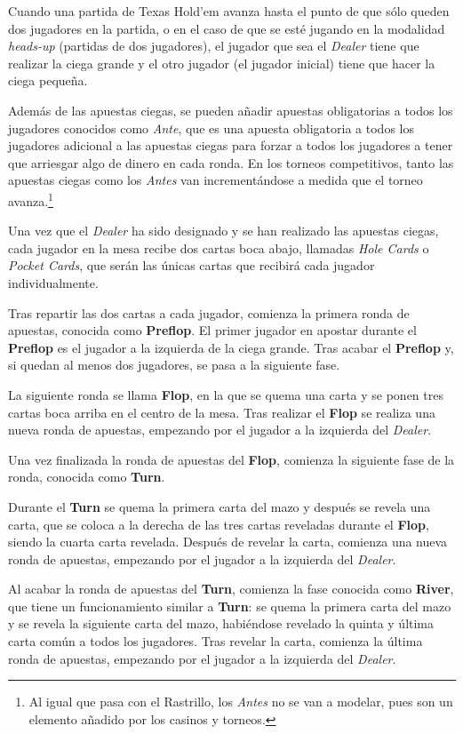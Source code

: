 Cuando una partida de Texas Hold'em avanza hasta el punto de que sólo queden dos jugadores en la partida, o en el caso de que se esté jugando en la modalidad \textit{heads-up} (partidas de dos jugadores), el jugador que sea el \textit{Dealer} tiene que realizar la ciega grande y el otro jugador (el jugador inicial) tiene que hacer la ciega pequeña.

Además de las apuestas ciegas, se pueden añadir apuestas obligatorias a todos los jugadores conocidos como \textit{Ante}, que es una apuesta obligatoria a todos los jugadores adicional a las apuestas ciegas para forzar a todos los jugadores a tener que arriesgar algo de dinero en cada ronda. En los torneos competitivos, tanto las apuestas ciegas como los \textit{Antes} van incrementándose a medida que el torneo avanza.\footnote{Al igual que pasa con el Rastrillo, los \textit{Antes} no se van a modelar, pues son un elemento añadido por los casinos y torneos.}

Una vez que el \textit{Dealer} ha sido designado y se han realizado las apuestas ciegas, cada jugador en la mesa recibe dos cartas boca abajo, llamadas \textit{Hole Cards} o \textit{Pocket Cards}, que serán las únicas cartas que recibirá cada jugador individualmente. 

Tras repartir las dos cartas a cada jugador, comienza la primera ronda de apuestas, conocida como \textbf{Preflop}. El primer jugador en apostar durante el \textbf{Preflop} es el jugador a la izquierda de la ciega grande. Tras acabar el \textbf{Preflop} y, si quedan al menos dos jugadores, se pasa a la siguiente fase. 

La siguiente ronda se llama \textbf{Flop}, en la que se quema una carta y se ponen tres cartas boca arriba en el centro de la mesa. Tras realizar el \textbf{Flop} se realiza una nueva ronda de apuestas, empezando por el jugador a la izquierda del \textit{Dealer}.


Una vez finalizada la ronda de apuestas del \textbf{Flop}, comienza la siguiente fase de la ronda, conocida como \textbf{Turn}.


Durante el \textbf{Turn} se quema la primera carta del mazo y después se revela una carta, que se coloca a la derecha de las tres cartas reveladas durante el \textbf{Flop}, siendo la cuarta carta revelada. Después de revelar la carta, comienza una nueva ronda de apuestas, empezando por el jugador a la izquierda del \textit{Dealer}.


Al acabar la ronda de apuestas del \textbf{Turn}, comienza la fase conocida como \textbf{River}, que tiene un funcionamiento similar a \textbf{Turn}: se quema la primera carta del mazo y se revela la siguiente carta del mazo, habiéndose revelado la quinta y última carta común a todos los jugadores. Tras revelar la carta, comienza la última ronda de apuestas, empezando por el jugador a la izquierda del \textit{Dealer}.


